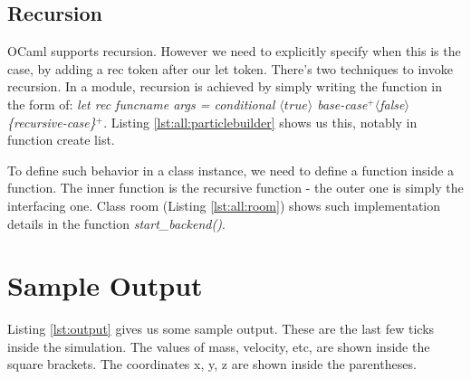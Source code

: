 \subsection{Recursion}
OCaml supports recursion. However we need to explicitly specify when this is
the case, by adding a rec token after our let token. There’s two techniques to
invoke recursion. In a module, recursion is achieved by simply writing the
function in the form of: \textit{let rec funcname args = conditional $\langle
true \rangle$ {base-case}$^{+}$$\langle$false$\rangle$
\{recursive-case\}$^{+}$}. Listing \ref{lst:all:particlebuilder} shows us this,
notably in function create list.  

To define such behavior in a class instance, we need to define a function
inside a function. The inner function is the recursive function - the outer one
is simply the interfacing one. Class room (Listing \ref{lst:all:room}) shows
such implementation details in the function \textit{start\_backend()}.

\section{Sample Output}

Listing \ref{lst:output} gives us some sample output. These are the last few
ticks inside the simulation. The values of mass, velocity, etc, are shown inside
the square brackets. The coordinates x, y, z are shown inside the parentheses.


